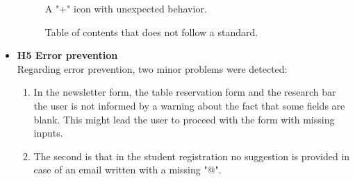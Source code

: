 \begin{itemize}
        \begin{figure}[!ht]
            \begin{minipage}{\linewidth}
                \centering
                \captionsetup{justification=centering}
                \caption{A "+" icon with unexpected behavior.}
                \label{H4-2}
            \end{minipage}
        \end{figure}
        \begin{figure}[!ht]
            \begin{minipage}{\linewidth}
                \centering
                \captionsetup{justification=centering}
                \caption{Table of contents that does not follow a standard.}
                \label{H4-3}
            \end{minipage}
        \end{figure} 
    \item \textbf{H5 Error prevention}\\
        Regarding error prevention, two minor problems were detected:
        \begin{enumerate}
            \item In the newsletter form, the table reservation form and the research bar the user is not informed by a warning about the fact that some fields are blank. This might lead the user to proceed with the form with missing inputs.
            \item The second is that in the student registration no suggestion is provided in case of an email written with a missing "@".

\end{enumerate}
\end{itemize}
